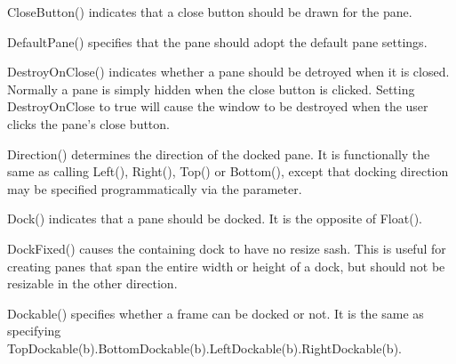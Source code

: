 CloseButton() indicates that a close button should be drawn for the pane.

\label{wxauipaneinfodefaultpane}


DefaultPane() specifies that the pane should adopt the default pane settings.

\label{wxauipaneinfodestroyonclose}


DestroyOnClose() indicates whether a pane should be detroyed when it is closed. Normally a pane is simply hidden when the close button is clicked. Setting DestroyOnClose to true will cause the window to be destroyed when the user clicks the pane's close button.

\label{wxauipaneinfodirection}


Direction() determines the direction of the docked pane. It is functionally the same as calling Left(), Right(), Top() or Bottom(), except that docking direction may be specified programmatically via the parameter.

\label{wxauipaneinfodock}


Dock() indicates that a pane should be docked.  It is the opposite of Float().

\label{wxauipaneinfodockfixed}


DockFixed() causes the containing dock to have no resize sash.  This is useful for creating panes that span the entire width or height of a dock, but should not be resizable in the other direction.

\label{wxauipaneinfodockable}


Dockable() specifies whether a frame can be docked or not. It is the same as specifying TopDockable(b).BottomDockable(b).LeftDockable(b).RightDockable(b).

\label{wxauipaneinfofixed}

